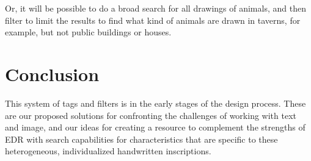 \documentclass[amsthm,ebook]{saparticle}
\begin{document}
Or, it will be possible to do a broad search for all drawings of animals, and then filter to limit the results to find
what kind of animals are drawn in taverns, for example, but not public buildings or houses. 




\section{Conclusion}


\noindent  This system of tags and filters is in the early stages of the design process. These are our proposed solutions for
confronting the challenges of working with text and image, and our ideas for creating a resource to complement the
strengths of EDR with search capabilities for characteristics that are specific to these heterogeneous, individualized
handwritten inscriptions. 

\nocite{wallace-hadrill_herculaneum:_2011}
\nocite{vivolo_pompei:_1993}
\nocite{guadagno_supplemento_1978}
\nocite{guadagno_supplemento_1981}
\nocite{della_corte_iscrizioni_1958}



\end{document}

